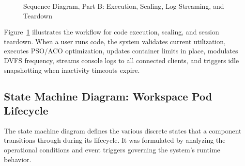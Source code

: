 \documentclass[12pt,a4paper]{report}
\newcommand{\sq}[5]{%
	\pgfmathsetmacro{\sqW}{max(abs(#2-#3)-0.5,1.5)}
	\draw[#1] (#2,#4) -- (#3,#4);
	\node[font=\rmfamily\footnotesize, text width=\sqW cm, align=center, anchor=south, inner sep=1.5pt]
	at ({(#2+#3)/2},#4) {#5};}
\newcommand{\sql}[6]{%
	\draw[#1] (#2,#4) -- (#3,#4);
	\node[font=\rmfamily\footnotesize, fill=white, anchor=south, inner sep=1.5pt, yshift=1pt]
	at ({#2+(#3-#2)*#6},#4) {#5};}
\newcommand{\selfm}[4]{%
	\draw[thick,black,->] (#1+0.1,#2) -- (#1+0.75,#2) -- (#1+0.75,#2-0.5) -- (#1+0.1,#2-0.5);
	\node[anchor=west,font=\rmfamily\footnotesize,text width=#4 cm,align=left,inner sep=1.5pt]
	at (#1+0.8,#2-0.25) {#3};}
\begin{document}
\begin{figure}[H]
{}
		\caption{Sequence Diagram, Part B: Execution, Scaling, Log Streaming, and Teardown}
		\label{fig:seq_b}
	\end{figure}
	
	Figure~\ref{fig:seq_b} illustrates the workflow for code execution, scaling, and session teardown. When a user runs code, the system validates current utilization, executes PSO/ACO optimization, updates container limits in place, modulates DVFS frequency, streams console logs to all connected clients, and triggers idle snapshotting when inactivity timeouts expire.
	
	\clearpage
	\subsection{State Machine Diagram: Workspace Pod Lifecycle}
	
	The state machine diagram defines the various discrete states that a component transitions through during its lifecycle. It was formulated by analyzing the operational conditions and event triggers governing the system's runtime behavior.
	
\end{document}
